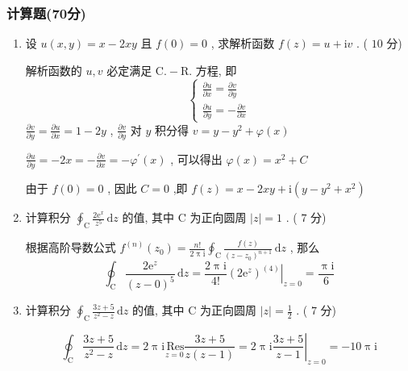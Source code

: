\documentclass[cn,11pt,fancy,hide]{elegantbook}
\newcommand{\ee}{\mathrm{e}}
\newcommand{\dd}{\,\mathrm{d}}
\newcommand{\ii}{\mathrm{i}}
\newcommand{\Res}{\,\mathrm{Res}}
\begin{document}
\subsubsection{计算题(70分)}
\begin{enumerate}
	\item 设 $u(x,y)=x-2xy$ 且 $f(0)=0$ , 求解析函数 $f(z)=u+\ii v$ . ( $10$ 分)
	\begin{solution}
		解析函数的 $u,v$ 必定满足 $\mathrm{C}.-\mathrm{R}.$ 方程, 即
		\begin{equation*}
			\begin{cases}
			\frac{\partial u}{\partial x}=\frac{\partial v}{\partial y}\\
			\frac{\partial u}{\partial y}=-\frac{\partial v}{\partial x}
			\end{cases}
		\end{equation*}
		$\frac{\partial v}{\partial y}=\frac{\partial u}{\partial x}=1-2 y$ , $\frac{\partial v}{\partial y}$ 对 $y$ 积分得 $v=y-y^{2}+\varphi(x)$
		
		$\frac{\partial u}{\partial y}=-2 x=-\frac{\partial v}{\partial x}=-\varphi^{\prime}(x)$ , 可以得出 $\varphi(x)=x^{2}+C$
		
		由于 $f(0)=0$ , 因此 $C=0$ ,即 $f(z)=x-2 x y+\ii\left(y-y^{2}+x^{2}\right)$
	\end{solution}
	
	\item 计算积分 $\oint_{\mathrm{C}}\frac{2\ee^x}{z^5}\dd z$ 的值, 其中 $\mathrm{C}$ 为正向圆周 $|z|=1$ . ( $7$ 分)
	\begin{solution}
		根据高阶导数公式 $f^{(n)}(z_0)=\frac{n!}{2\uppi\ii}\oint_{\mathrm{C}}\frac{f(z)}{(z-z_0)^{n+1}}\dd z$ , 那么
		\begin{equation*}
			\oint_{\mathrm{C}} \frac{2 \ee^{z}}{(z-0)^{5}} \dd z=\frac{2 \uppi \ii}{4 !}\left.\left(2 \ee^{z}\right)^{(4)}\right|_{z=0}=\frac{\uppi \ii}{6}
		\end{equation*}
	\end{solution}
	
	\item 计算积分 $\oint_{\mathrm{C}}\frac{3z+5}{z^2-z}\dd z$ 的值, 其中 $\mathrm{C}$ 为正向圆周 $|z|=\frac{1}{2}$ . ( $7$ 分)
	\begin{solution}
		\begin{equation*}
			\oint_{\mathrm{C}}\frac{3z+5}{z^2-z}\dd z=2\uppi\ii\underset{z=0}{\Res}\frac{3z+5}{z(z-1)}=2\uppi\ii\left.\frac{3z+5}{z-1}\right|_{z=0}=-10\uppi\ii
		\end{equation*}
	\end{solution}
	

\end{enumerate}
\end{document}
